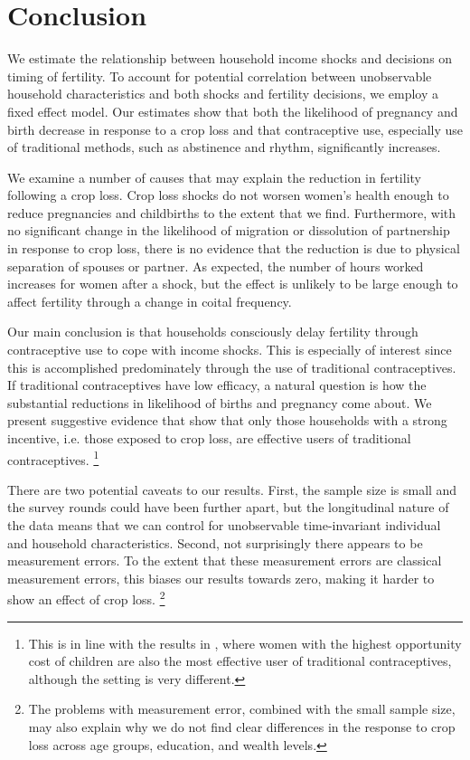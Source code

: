 \documentclass[letterpaper,12pt]{article}
\begin{document}
\section{Conclusion}

We estimate the relationship between household income shocks and decisions
on timing of fertility. 
To account for potential correlation between unobservable household
characteristics and both shocks and fertility decisions, we employ a fixed effect model.
Our estimates show that both the likelihood of pregnancy and birth decrease in
response to a crop loss and that contraceptive use, especially use of traditional 
methods, such as abstinence and rhythm, significantly increases. 

We examine a number of causes that may explain the reduction 
in fertility following a crop loss.
Crop loss shocks do not worsen women's health enough to 
reduce pregnancies and childbirths to the extent that we find.
Furthermore, with no significant change in the likelihood of migration or 
dissolution of partnership in response to crop loss, there is no evidence 
that the reduction is due to physical separation of spouses or partner.
As expected, the number of hours worked increases for women after a shock, 
but the effect is unlikely to be large enough to affect fertility 
through a change in coital frequency.

Our main conclusion is that households consciously delay 
fertility through contraceptive use to cope with income shocks. 
This is especially of interest since this is accomplished 
predominately through the use of traditional contraceptives.
If traditional contraceptives have low efficacy, a natural question is 
how the substantial reductions in likelihood of births and pregnancy 
come about.
We present suggestive evidence that show that only those households
with a strong incentive, i.e. those exposed to crop loss, are 
effective users of traditional contraceptives.%
\footnote{
This is in line with the results in \cite{Rosenzweig1989},
where women with the highest opportunity cost of children
are also the most effective user of traditional contraceptives,
although the setting is very different.
}


There are two potential caveats to our results.
First, the sample size is small and the survey rounds
could have been further apart, but the longitudinal nature
of the data means that we can control for unobservable 
time-invariant individual and household characteristics.
Second, not surprisingly there appears to be measurement 
errors.
To the extent that these measurement errors are classical 
measurement errors, this biases our results towards zero,
making it harder to show an effect of crop loss.%
\footnote{
The problems with measurement error, combined with the small
sample size, may also explain why we do not find clear
differences in the response to crop loss across age groups,
education, and wealth levels.
}
\end{document}

